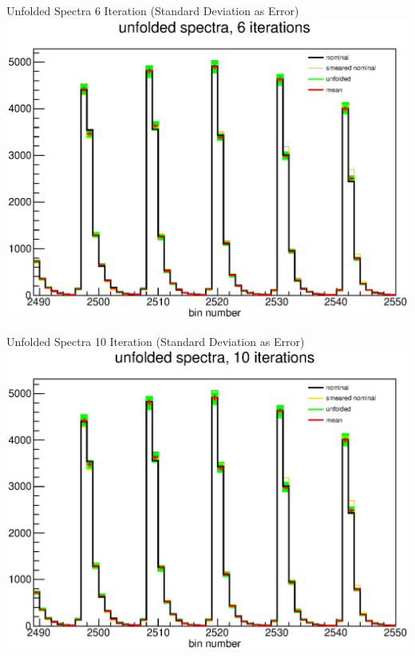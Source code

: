 \documentclass[aspectratio=169]{beamer}
\begin{document}
\begin{frame}{Unfolded Spectra 6 Iteration (Standard Deviation as Error)}
  \centering
  \includegraphics[height=\textheight]{figures/unfolded_pseudo_exps_iter6.eps}
\end{frame}

\begin{frame}{Unfolded Spectra 10 Iteration (Standard Deviation as Error)}
  \centering
  \includegraphics[height=\textheight]{figures/unfolded_pseudo_exps_iter10.eps}
\end{frame}
\end{document}
